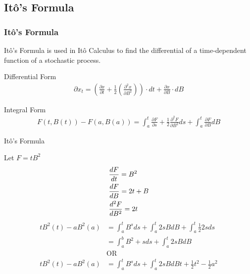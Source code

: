 
\subsection{It\^o's Formula}

\begin{frame}
\frametitle{It\^o's Formula}
It\^o's Formula is used in It\^o Calculus to find the differential of a time-dependent function of a stochastic process.
\vfill

		 \begin{block}{Differential Form}
      \begin{align*}
				\displaystyle \partial x_t =\left(\frac{\partial x}{\partial t} + \frac{1}{2} \left(\frac{\partial ^2 x}{\partial B ^2}\right)\right) \cdot  dt + \frac{\partial x}{\partial B} \cdot dB 
			\end{align*}
    \end{block}
		
\vfill

		\begin{block}{Integral Form}
      \begin{align*}
				\displaystyle F(t, B(t))-F(a,B(a))=
 \int_{a}^{t} \frac{\partial F}{\partial s} + \frac{1}{2} \frac{\partial^2 F}{\partial B^2}ds+
 \int_a^t \frac{\partial F}{\partial B} dB
			\end{align*}
    \end{block}

\vfill
\end{frame}

\begin{frame}{It\^o's Formula} 

Let $F=tB^2$ 
\begin{align*}
\displaystyle
&\frac{dF}{dt}= B^2\\
&\frac{dF}{dB}=2t+B\\ 
&\frac{d^2 F}{dB^2}=2t
\end{align*}
\begin{align*}
tB^2(t)-aB^2(a) &=\int_{a}^{t}B^s ds+ \int_{a}^{t}2sBdB+\int_a^t \frac{1}{2}2sds\\
 &=\int_a^b B^2+sds+\int_a^t 2sBdB\\
 &\text{OR}\\
tB^2(t)-aB^2(a) &= \int_a^t B^s ds+ \int_a^t 2sBdBt+ \frac{1}{2} t^2- \frac{1}{2}a^2
\end{align*}
\end{frame}

